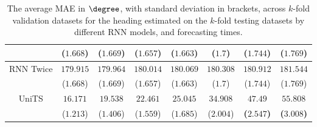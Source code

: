 \begin{table}[!ht]
{\begin{tabular}{|c|c|c|c|c|c|c|c|}
			 & ($1.668$) & ($1.669$) & ($1.657$) & ($1.663$) & ($1.7$) & ($1.744$) & ($1.769$) \\ \hline
			\multirow{2}{*}{RNN Twice} & $179.915$ & $179.964$ & $180.014$ & $180.069$ & $180.308$ & $180.912$ & $181.544$ \\
			 & ($1.668$) & ($1.669$) & ($1.657$) & ($1.663$) & ($1.7$) & ($1.744$) & ($1.769$) \\ \hline
			\multirow{2}{*}{UniTS} & $16.171$ & $19.538$ & $22.461$ & $25.045$ & $34.908$ & $\mathbf{47.49}$ & $\mathbf{55.808}$ \\
			 & ($1.213$) & ($1.406$) & ($1.559$) & ($1.685$) & ($2.004$) & \textbf{(}$\mathbf{2.547}$\textbf{)} & \textbf{(}$\mathbf{3.008}$\textbf{)} \\ \hline
		\end{tabular}
	}
	\caption{The average MAE in $\degree$, with standard deviation in brackets, across $k$-fold validation datasets for the heading estimated on the $k$-fold testing datasets by different RNN models, and forecasting times.}
	\label{tab:all_direction_MAE}
\end{table}

